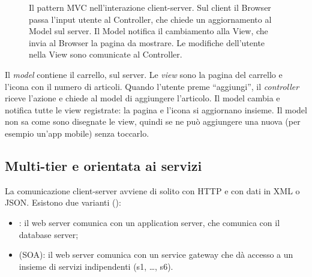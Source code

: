 \begin{figure}[ht]
\centering
{}
\caption{Il pattern MVC nell'interazione client-server. Sul client il Browser passa l'input utente al Controller, che
chiede un aggiornamento al Model sul server. Il Model notifica il cambiamento alla View, che invia al Browser la
pagina da mostrare. Le modifiche dell'utente nella View sono comunicate al Controller.}
\label{fig:arch-mvc}
\end{figure}

\begin{esempio}
Il \emph{model} contiene il carrello, sul server. Le \emph{view} sono la pagina del carrello e l'icona con il numero
di articoli. Quando l'utente preme ``aggiungi'', il \emph{controller} riceve l'azione e chiede al model di aggiungere
l'articolo. Il model cambia e notifica tutte le view registrate: la pagina e l'icona si aggiornano insieme. Il model
non sa come sono disegnate le view, quindi se ne può aggiungere una nuova (per esempio un'app mobile) senza toccarlo.
\end{esempio}

\subsection{Multi-tier e orientata ai servizi}

La comunicazione client-server avviene di solito con HTTP e con dati in XML o JSON. Esistono due varianti
():
\begin{itemize}
  \item {}: il web server comunica con un application server, che comunica con il database
    server;
  \item {} (SOA): il web server comunica con un service gateway che dà accesso a
    un insieme di servizi indipendenti (s1, \dots, s6).
\end{itemize}

